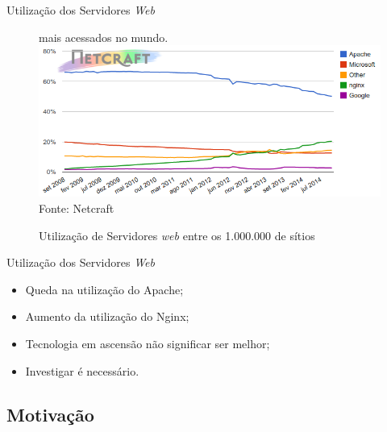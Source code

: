 \begin{frame}{Utilização dos Servidores \textit{Web}}
	\begin{figure}
		\centering
		\caption{Utilização de Servidores \textit{web} entre os 1.000.000 de 
		sítios 
		}
		mais acessados no mundo.
		\includegraphics[width=1\linewidth]{../figuras/grafico2} \\
		Fonte: Netcraft
	\end{figure}
\end{frame}
\begin{frame}{Utilização dos Servidores \textit{Web}}
	\begin{itemize}
		\item Queda na utilização do Apache; \pause
		\item Aumento da utilização do Nginx; \pause
		\item Tecnologia em ascensão não significar ser melhor; \pause
		\item Investigar é necessário.
	\end{itemize}
\end{frame}

\subsection{Motivação}

